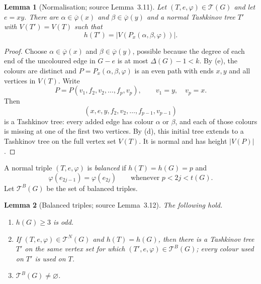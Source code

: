 \documentclass[11pt]{article}
\newtheorem{lemma}[lemma]{Lemma}
\theoremstyle{definition}
\newcommand{\Tcal}{\mathcal T}
\begin{document}
\setcounter{theorem}{10}
\begin{lemma}[Normalisation; source Lemma~3.11]
\label{Scheide-Lemma-3.11}\label{normalisation}
Let $(T,e,\varphi)\in\Tcal(G)$ and let $e=xy$. There are
$\alpha\in\overline\varphi(x)$ and
$\beta\in\overline\varphi(y)$ and a normal Tashkinov tree $T'$ with
$V(T')=V(T)$ such that
\[
 h(T')=|V(P_x(\alpha,\beta,\varphi))|.
\]
\end{lemma}

\begin{proof}
Choose $\alpha\in\overline\varphi(x)$ and
$\beta\in\overline\varphi(y)$, possible because the degree of each end of
the uncoloured edge in $G-e$ is at most $\Delta(G)-1<k$. By
(e), the colours are distinct and
$P=P_x(\alpha,\beta,\varphi)$ is an even path with ends $x,y$ and all
vertices in $V(T)$. Write
\[
 P=P(v_1,f_2,v_2,\ldots,f_p,v_p),\qquad v_1=y,\quad v_p=x.
\]
Then
\[
 (x,e,y,f_2,v_2,\ldots,f_{p-1},v_{p-1})
\]
is a Tashkinov tree: every added edge has colour $\alpha$ or $\beta$, and
each of those colours is missing at one of the first two vertices. By
(d), this initial tree extends to a Tashkinov tree
on the full vertex set $V(T)$. It is normal and has height $|V(P)|$.
\end{proof}

A normal triple $(T,e,\varphi)$ is \emph{balanced} if
$h(T)=h(G)=p$ and
\[
 \varphi(e_{2j-1})=\varphi(e_{2j})
 \qquad\text{whenever }p<2j<t(G).
\]
Let $\Tcal^B(G)$ be the set of balanced triples.

\begin{lemma}[Balanced triples; source Lemma~3.12]
\label{Scheide-Lemma-3.12}\label{balanced-triples}
The following hold.
\begin{enumerate}[label=\textup{(\alph*)}]
\item $h(G)\ge3$ is odd.
\item If $(T,e,\varphi)\in\Tcal^N(G)$ and $h(T)=h(G)$, then there is a
      Tashkinov tree $T'$ on the same vertex set for which
      $(T',e,\varphi)\in\Tcal^B(G)$; every colour used on $T'$ is used on
      $T$.
\item $\Tcal^B(G)\ne\varnothing$.
\end{enumerate}
\end{lemma}
\end{document}
